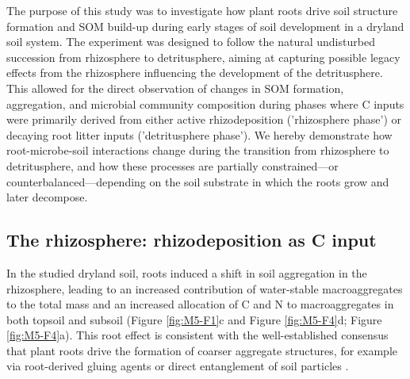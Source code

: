 The purpose of this study was to investigate how plant roots drive soil structure formation and SOM build-up during early stages of soil development in a dryland soil system. The experiment was designed to follow the natural undisturbed succession from rhizosphere to detritusphere, aiming at capturing possible legacy effects from the rhizosphere influencing the development of the detritusphere. This allowed for the direct observation of changes in SOM formation, aggregation, and microbial community composition during phases where C inputs were primarily derived from either active rhizodeposition ('rhizosphere phase') or decaying root litter inputs ('detritusphere phase'). We hereby demonstrate how root-microbe-soil interactions change during the transition from rhizosphere to detritusphere, and how these processes are partially constrained—or counterbalanced—depending on the soil substrate in which the roots grow and later decompose.

\subsection{The rhizosphere: rhizodeposition as C input}

In the studied dryland soil, roots induced a shift in soil aggregation in the rhizosphere, leading to an increased contribution of water-stable macroaggregates to the total mass and an increased allocation of C and N to macroaggregates in both topsoil and subsoil (Figure \ref{fig:M5-F1}c and Figure \ref{fig:M5-F4}d; Figure \ref{fig:M5-F4}a). This root effect is consistent with the well-established consensus that plant roots drive the formation of coarser aggregate structures, for example via root-derived gluing agents or direct entanglement of soil particles \citep{Tisdall1982, Six2004, Angst2018, Gregory2022}.

